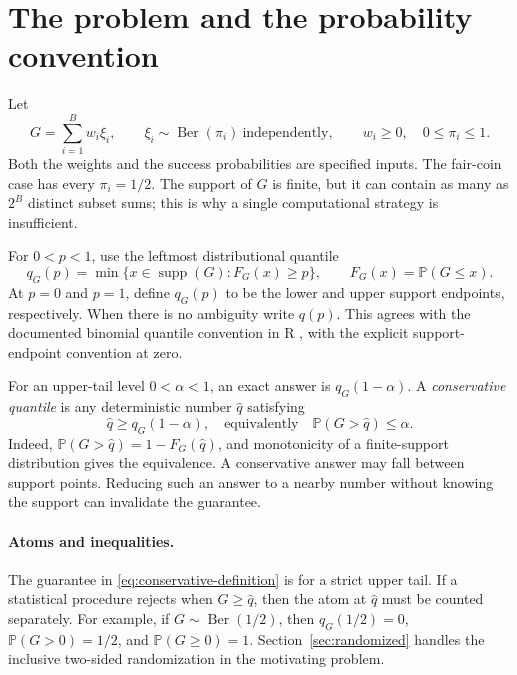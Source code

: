 \documentclass[11pt,letterpaper]{article}
\numberwithin{equation}{section}
\theoremstyle{definition}
\theoremstyle{remark}
\DeclareMathOperator{\supp}{supp}
\begin{document}
\section{The problem and the probability convention}
\label{sec:setup}

Let
\begin{equation}
  G=\sum_{i=1}^{B}w_i\xi_i,\qquad
  \xi_i\sim\operatorname{Ber}(\pi_i)\ \text{independently},\qquad
  w_i\ge0,\quad 0\le\pi_i\le1.
  \label{eq:model}
\end{equation}
Both the weights and the success probabilities are specified inputs. The
fair-coin case has every $\pi_i=1/2$. The support of $G$ is finite, but it
can contain as many as $2^B$ distinct subset sums; this is why a single
computational strategy is insufficient.

For $0<p<1$, use the leftmost distributional quantile
\begin{equation}
  q_G(p)=\min\{x\in\supp(G):F_G(x)\ge p\},
  \qquad F_G(x)=\mathbb P(G\le x).
  \label{eq:quantile-definition}
\end{equation}
At $p=0$ and $p=1$, define $q_G(p)$ to be the lower and upper support
endpoints, respectively. When there is no ambiguity write $q(p)$.
This agrees with the documented binomial quantile convention in R
\cite{rbinomial}, with the explicit support-endpoint convention at zero.

For an upper-tail level $0<\alpha<1$, an exact answer is $q_G(1-\alpha)$.
A \emph{conservative quantile} is any deterministic number $\widehat q$
satisfying
\begin{equation}
  \widehat q\ge q_G(1-\alpha),
  \quad\text{equivalently}\quad
  \mathbb P(G>\widehat q)\le\alpha.
  \label{eq:conservative-definition}
\end{equation}
Indeed, $\mathbb P(G>\widehat q)=1-F_G(\widehat q)$, and monotonicity
of a finite-support distribution gives the equivalence. A conservative
answer may fall between support points. Reducing such an answer to a
nearby number without knowing the support can invalidate the guarantee.

\paragraph{Atoms and inequalities.}
The guarantee in \eqref{eq:conservative-definition} is for a strict upper
tail. If a statistical procedure rejects when $G\ge\widehat q$, then the
atom at $\widehat q$ must be counted separately. For example, if
$G\sim\operatorname{Ber}(1/2)$, then $q_G(1/2)=0$,
$\mathbb P(G>0)=1/2$, and $\mathbb P(G\ge0)=1$. Section~\ref{sec:randomized}
handles the inclusive two-sided randomization in the motivating problem.
\end{document}
